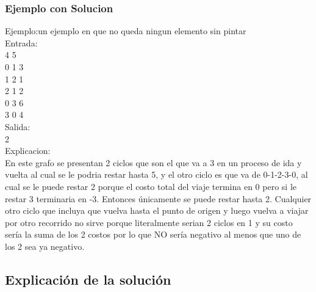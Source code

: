 \subsubsection{Ejemplo con Solucion}
Ejemplo:un ejemplo en que no queda ningun elemento sin pintar\\
Entrada:\\
4 5\\
0 1 3\\
1 2 1\\
2 1 2\\
0 3 6\\
3 0 4\\
Salida:\\
2\\
Explicacion:\\
En este grafo se presentan 2 ciclos que son el que va a 3 en un proceso de ida y vuelta al cual se le podria restar hasta 5, y el otro ciclo es que va de 0-1-2-3-0, al cual se le puede restar 2 porque el costo total del viaje termina en 0 pero si le restar 3 terminaria en -3. Entonces únicamente se puede restar hasta 2. Cualquier otro ciclo que incluya que vuelva hasta el punto de origen y luego vuelva a viajar por otro recorrido no sirve porque literalmente serian 2 ciclos en 1 y su costo sería la suma de los 2 costos por lo que NO sería negativo al menos que uno de los 2 sea ya negativo.



\subsection{Explicación de la solución}

